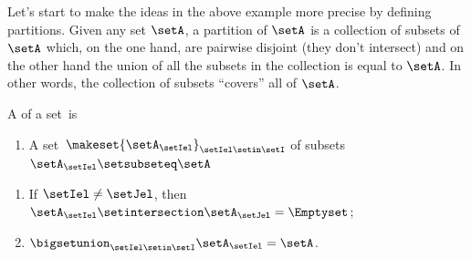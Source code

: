 %

Let's start to make the ideas in the above example more precise by defining partitions.
Given any set $\setA$, a partition of $\setA$ is a collection of subsets of $\setA$ which, on the one hand, are pairwise disjoint (they don't intersect) and on the other hand the union of all the subsets in the collection is equal to $\setA$.
In other words, the collection of subsets ``covers'' all of $\setA$.

\begin{ctdefinition}[Partition]
    \label{def:partition}
    A  of a set~\setA is

    \constit
    \begin{enumerate}
        \item A set~$\makeset{\setA_\setIel}_{\setIel\setin \setI}$ of subsets~$\setA_\setIel\setsubseteq \setA$
    \end{enumerate}
    \condit
    \begin{enumerate}
        \item If $\setIel\neq \setJel$,  then $\setA_\setIel\setintersection \setA_\setJel=\Emptyset$;
        \item $\bigsetunion_{\setIel\setin \setI}\setA_\setIel=\setA$.
    \end{enumerate}
\end{ctdefinition}

